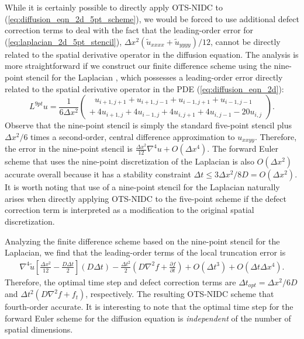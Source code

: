 \documentclass[fleqn,12pt,twoside]{article}
\newcommand{\beq}{\begin{equation}}
\newcommand{\eeq}{\end{equation}}
\newcommand{\bea}{\begin{eqnarray}}
\newcommand{\eea}{\end{eqnarray}}
\def\pt{\partial t}
\def\tu{\tilde{u}}
\def\dt{\Delta t}
\def\dx{\Delta x}
\def\dto{\dt_{opt}}
\begin{document}
While it is certainly possible to directly apply OTS-NIDC
to (\ref{eq:diffusion_eqn_2d_5pt_scheme}), we would be forced to use additional
defect correction terms to deal with the fact that the leading-order error for 
(\ref{eq:laplacian_2d_5pt_stencil}), 
$\dx^2 \left(\tu_{xxxx} + \tu_{yyyy}\right)/12$, cannot be directly related 
to the spatial derivative operator in the diffusion equation.  
The analysis is more straightforward if we construct our finite difference 
scheme using the nine-point stencil for the 
Laplacian \cite{iserles_book,patra_2005}, which possesses a leading-order 
error directly related to the spatial derivative operator in the PDE 
(\ref{eq:diffusion_eqn_2d}):
\beq
  L^{9pt} u = \frac{1}{6 \dx^2} \left( 
      \begin{array}{l}
         \ \ \ u_{i+1,j+1} + u_{i+1,j-1}
            + u_{i-1,j+1} + u_{i-1,j-1} \\
         +\ 4 u_{i+1,j} + 4 u_{i-1,j}
           + 4 u_{i,j+1} + 4 u_{i,j-1}
           -20 u_{i,j} 
      \end{array}
    \right). 
  \label{eq:laplacian_2d_9pt_stencil}
\eeq
Observe that the nine-point stencil is simply the standard five-point 
stencil plus $\dx^2/6$ times a second-order, central difference 
approximation to $u_{xxyy}$.  Therefore, the error in the nine-point stencil
is $\frac{\dx^2}{12} \nabla^4 u + O(\dx^4)$.  The forward Euler scheme that 
uses the nine-point discretization of the Laplacian is also $O(\dx^2)$ accurate
overall because it has a stability constraint $\dt \le 3\dx^2/8D = O(\dx^2)$.
It is worth noting that use of a nine-point stencil for the Laplacian 
naturally arises when directly applying OTS-NIDC to the five-point scheme if 
the defect correction term is interpreted as a modification to the original 
spatial discretization.

Analyzing the finite difference scheme based on the nine-point stencil for the
Laplacian, we find that the leading-order terms of the local truncation error
is
\bea
  \nabla^4 \tu
      \left[ \frac{\dx^2}{12} - \frac{D \dt}{2}  \right] (D \dt)
  - \frac{\dt^2}{2} \left( D\nabla^2 f + \frac{\partial f}{\pt} \right)
  + O(\dt^3) + O(\dt \dx^4).
  \label{eq:diffusion_eqn_2d_trunc_err}
\eea
Therefore, the optimal time step and defect correction terms are 
$\dto = \dx^2/6D$ and $\dt^2 \left( D\nabla^2 f + f_t \right)$, respectively.
The resulting OTS-NIDC scheme that fourth-order accurate.  It is interesting
to note that the optimal time step for the forward Euler scheme for the
diffusion equation is \emph{independent} of the number of spatial dimensions.
\end{document}
